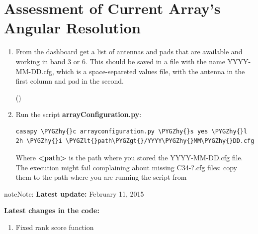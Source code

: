 \documentclass[a4paper,10pt,english]{sphinxmanual}
\def\PYGZlt{\char`\<}
\def\PYGZgt{\char`\>}
\def\PYGZhy{\char`\-}
\begin{document}
\section{Assessment of Current Array's Angular Resolution}
\label{apendix:assessment-of-current-array-s-angular-resolution}\label{apendix:current-conf}\begin{enumerate}
\item {} 
From the dashboard get a list of antennas and pads that are available and
working in band 3 or 6. This should be saved in a file with the name
YYYY-MM-DD.cfg, which is a space-separeted values file, with the antenna in the
first column and pad in the second.

()

\item {} 
Run the script \textbf{arrayConfiguration.py}:

\begin{Verbatim}[commandchars=\\\{\}]
casapy \PYGZhy{}c arrayconfiguration.py \PYGZhy{}s yes \PYGZhy{}l 2h \PYGZhy{}i \PYGZlt{}path\PYGZgt{}/YYYY\PYGZhy{}MM\PYGZhy{}DD.cfg
\end{Verbatim}

Where \textbf{\textless{}path\textgreater{}} is the path where you stored the YYYY-MM-DD.cfg file.
The execution might fail complaining about missing C34-?.cfg files: copy them
to the path where you are running the script from

\end{enumerate}

\begin{notice}{note}{Note:}
\textbf{Latest update:}
February 11, 2015

\textbf{Latest changes in the code:}
\begin{enumerate}
\item {} 
Fixed rank score function

\end{enumerate}
\end{notice}
\end{document}
